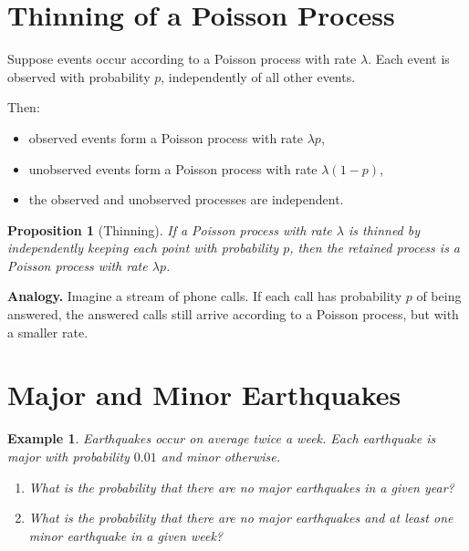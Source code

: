 \documentclass[12pt,a4paper]{article}
\theoremstyle{lecturestyle}
\newtheorem{example}{Example}
\newtheorem{proposition}{Proposition}
\begin{document}
\section{Thinning of a Poisson Process}

Suppose events occur according to a Poisson process with rate $\lambda$. Each event is observed with probability $p$, independently of all other events.

Then:
\begin{itemize}[leftmargin=1.2cm]
    \item observed events form a Poisson process with rate $\lambda p$,
    \item unobserved events form a Poisson process with rate $\lambda(1-p)$,
    \item the observed and unobserved processes are independent.
\end{itemize}

\begin{proposition}[Thinning]
If a Poisson process with rate $\lambda$ is thinned by independently keeping each point with probability $p$, then the retained process is a Poisson process with rate $\lambda p$.
\end{proposition}

\textbf{Analogy.} Imagine a stream of phone calls. If each call has probability $p$ of being answered, the answered calls still arrive according to a Poisson process, but with a smaller rate.

\section{Major and Minor Earthquakes}

\begin{example}
Earthquakes occur on average twice a week. Each earthquake is major with probability $0.01$ and minor otherwise.

\begin{enumerate}[label=(\alph*)]
    \item What is the probability that there are no major earthquakes in a given year?
    \item What is the probability that there are no major earthquakes and at least one minor earthquake in a given week?
\end{enumerate}
\end{example}
\end{document}
